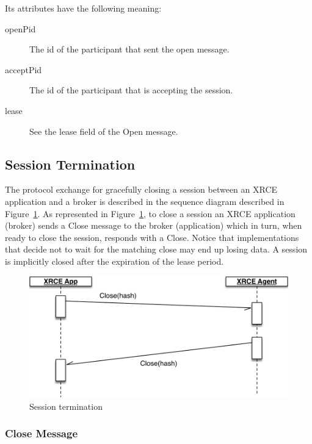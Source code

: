 \documentclass[a4paper,oneside,article]{memoir}
\begin{document}
Its attributes have the following meaning:
\begin{description}
\item[openPid] The id of the participant that sent the open message.
\item[acceptPid] The id of the participant that is accepting the session.
\item[lease] See the lease field of the Open message.
\end{description}

\subsection{Session Termination}

The protocol exchange for gracefully closing a session between an XRCE application and a broker is
described in the sequence diagram described in Figure~\ref{fig:close-session}.  As represented in
Figure~\ref{fig:close-session}, to close a session an XRCE application (broker) sends a Close message
to the broker (application) which in turn, when ready to close the session, responds with a Close.
Notice that implementations that decide not to wait for the matching close may end up losing data.
A session is implicitly closed after the expiration of the lease period.
 
\begin{figure}
\centering
\includegraphics[scale=0.6]{close-session.pdf}
\caption{Session termination}\label{fig:close-session}
\end{figure}

\subsubsection{Close Message}
\end{document}
